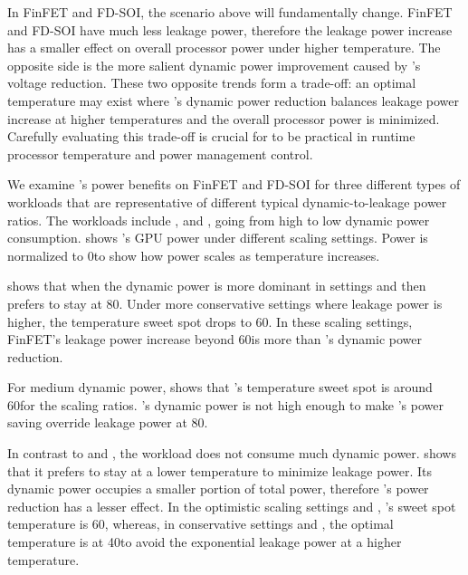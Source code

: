 In FinFET and FD-SOI, the scenario above will fundamentally change. FinFET and FD-SOI have much less leakage power, therefore the leakage power increase has a smaller effect on overall processor power under higher temperature. The opposite side is the more salient dynamic power improvement caused by \tistate's voltage reduction. These two opposite trends form a trade-off: an optimal temperature may exist where \tistate's dynamic power reduction balances leakage power increase at higher temperatures and the overall processor power is minimized. Carefully evaluating this trade-off is crucial for \tistate to be practical in runtime processor temperature and power management control. 

We examine \tistate's power benefits on FinFET and FD-SOI for three different types of workloads that are representative of different typical dynamic-to-leakage power ratios. The workloads include ,  and , going from high to low dynamic power consumption.  shows \tistate's GPU power under different scaling settings. Power is normalized to 0\C to show how power scales as temperature increases. 

 shows that when the dynamic power is more dominant in settings  and  then  prefers to stay at 80\C. Under more conservative settings where leakage power is higher, the temperature sweet spot drops to 60\C. In these scaling settings, FinFET's leakage power increase beyond 60\C is more than \tistate's dynamic power reduction.

For medium dynamic power,  shows that 's temperature sweet spot is around 60\C for the scaling ratios. 's dynamic power is not high enough to make \tistate's power saving override leakage power at 80\C. 

In contrast to  and , the workload  does not consume much dynamic power.  shows that it prefers to stay at a lower temperature to minimize leakage power. Its dynamic power occupies a smaller portion of total power, therefore \tistate's power reduction has a lesser effect. In the optimistic scaling settings  and , 's sweet spot temperature is 60\C, whereas, in conservative settings  and , the optimal temperature is at 40\C to avoid the exponential leakage power at a higher temperature. 

